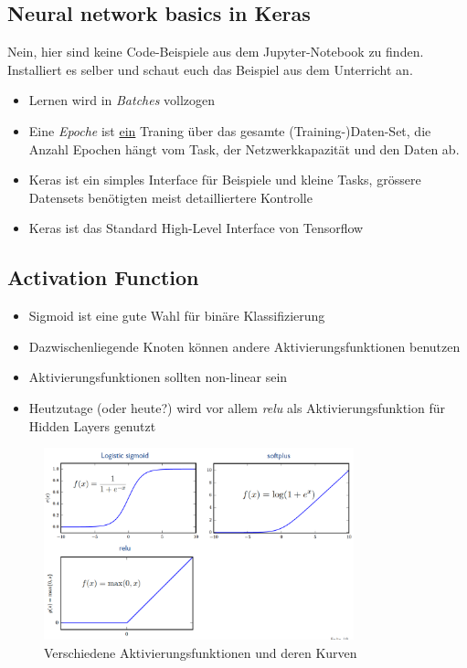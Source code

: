 \documentclass[a4paper]{article}
\begin{document}
		\subsection{Neural network basics in Keras}
		
		Nein, hier sind keine Code-Beispiele aus dem Jupyter-Notebook zu finden.
		Installiert es selber und schaut euch das Beispiel aus dem Unterricht an.
		\begin{itemize}
			\item Lernen wird in \textit{Batches} vollzogen
			\item Eine \textit{Epoche} ist \underline{ein} Traning über das gesamte (Training-)Daten-Set, die Anzahl Epochen hängt vom Task, der Netzwerkkapazität und den Daten ab.
			\item Keras ist ein simples Interface für Beispiele und kleine Tasks, grössere Datensets benötigten meist detailliertere Kontrolle
			\item Keras ist das Standard High-Level Interface von Tensorflow
		\end{itemize}
	
		\subsection{Activation Function}
		
		\begin{itemize}
			\item Sigmoid ist eine gute Wahl für binäre Klassifizierung
			\item Dazwischenliegende Knoten können andere Aktivierungsfunktionen benutzen
			\item Aktivierungsfunktionen sollten non-linear sein
			\item Heutzutage (oder heute?) wird vor allem \textit{relu} als Aktivierungsfunktion für Hidden Layers genutzt
		\end{itemize}
	
		\begin{figure}[htb!]
			\centering
			\includegraphics[width=0.8\textwidth]{img/05_neuronal_networks/activation_functions.png}
			\caption{Verschiedene Aktivierungsfunktionen und deren Kurven}
			\label{fig:05_neuronet_activation_functions}
		\end{figure}
		
\end{document}
